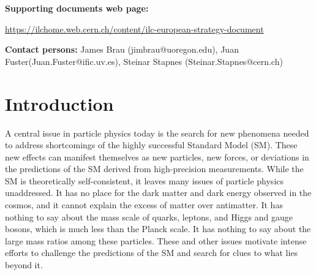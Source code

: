\documentclass[%
 reprint,
 floatfix,
 amsmath,amssymb,
 aps,
]{revtex4-1}
\newcommand{\todo}[1]{\textcolor{red}{{#1}}}
\begin{document}
\maketitle
\onecolumngrid
\textbf{Supporting documents web page:} 

\vspace{-0.8cm}
\url{https://ilchome.web.cern.ch/content/ilc-european-strategy-document}

\textbf{Contact persons:} 
James Brau (jimbrau@uoregon.edu), Juan Fuster(Juan.Fuster@ific.uv.es), Steinar Stapnes (Steinar.Stapnes@cern.ch)
\vspace{1cm}

\pagebreak

\pagestyle{plain}
\setcounter{page}{1}

\twocolumngrid



\vspace{-.4cm}

\section{\label{sec:intro}Introduction}

\vspace{-.3cm}


A central issue in particle physics today is the search for new
 phenomena needed to address shortcomings of the 
highly successful Standard Model (SM).  These new effects can manifest
themselves as new particles, new forces, 
 or deviations in the predictions of the SM derived from
 high-precision measurements. While the SM is theoretically
 self-consistent,
it leaves many issues of particle physics unaddressed. 
It has no place for the dark matter and dark energy observed in the
cosmos,
and it cannot explain the excess of matter over antimatter.   It has
nothing to say about the mass scale of quarks, leptons, and Higgs and gauge 
bosons, which is much less than the Planck scale.   It has nothing 
to say about the large mass ratios among these particles.   These and 
other issues motivate intense efforts to challenge the predictions of
the SM and search for clues to what lies beyond it.
 
\end{document}

